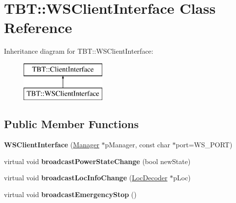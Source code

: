 \hypertarget{classTBT_1_1WSClientInterface}{}\section{T\+BT\+:\+:W\+S\+Client\+Interface Class Reference}
\label{classTBT_1_1WSClientInterface}
Inheritance diagram for T\+BT\+:\+:W\+S\+Client\+Interface\+:\begin{figure}[H]
\begin{center}
\leavevmode
\includegraphics[height=2.000000cm]{classTBT_1_1WSClientInterface}
\end{center}
\end{figure}
\subsection*{Public Member Functions}
\begin{DoxyCompactItemize}
\item 
\mbox{\label{classTBT_1_1WSClientInterface_addd44890c3c54a9700a2385a63105e38}} 
{\bfseries W\+S\+Client\+Interface} (\hyperlink{classTBT_1_1Manager}{Manager} $\ast$p\+Manager, const char $\ast$port=W\+S\+\_\+\+P\+O\+RT)
\item 
\mbox{\label{classTBT_1_1WSClientInterface_ad1c7f413c63f04b04d6e20f5d154d1fd}} 
virtual void {\bfseries broadcast\+Power\+State\+Change} (bool new\+State)
\item 
\mbox{\label{classTBT_1_1WSClientInterface_a39806206461815c06c517b66d122b4db}} 
virtual void {\bfseries broadcast\+Loc\+Info\+Change} (\hyperlink{classTBT_1_1LocDecoder}{Loc\+Decoder} $\ast$p\+Loc)
\item 
\mbox{\label{classTBT_1_1WSClientInterface_a2ad439e557711c57c8a978e3b6efcb62}} 
virtual void {\bfseries broadcast\+Emergency\+Stop} ()
\end{DoxyCompactItemize}
